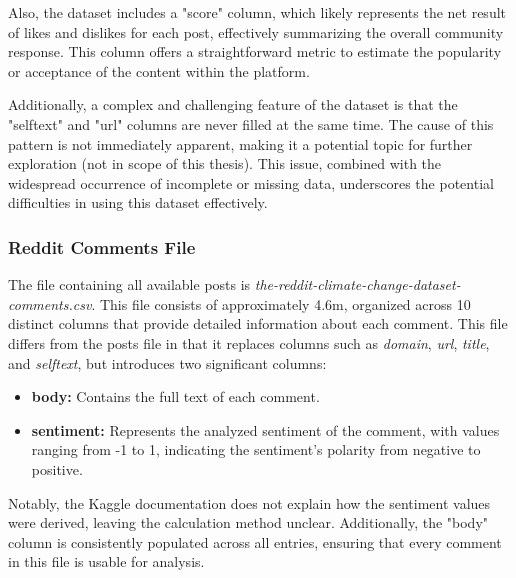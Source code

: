 Also, the dataset includes a "score" column, which likely represents the net result of likes and dislikes for each post, effectively summarizing the overall community response. This column offers a straightforward metric to estimate the popularity or acceptance of the content within the platform.

Additionally, a complex and challenging feature of the dataset is that the "selftext" and "url" columns are never filled at the same time. The cause of this pattern is not immediately apparent, making it a potential topic for further exploration (not in scope of this thesis). This issue, combined with the widespread occurrence of incomplete or missing data, underscores the potential difficulties in using this dataset effectively.

\subsubsection{Reddit Comments File}
The file containing all available posts is \emph{the-reddit-climate-change-dataset-comments.csv}. This file consists of approximately 4.6m, organized across 10 distinct columns that provide detailed information about each comment. This file differs from the posts file in that it replaces columns such as \emph{domain}, \emph{url}, \emph{title}, and \emph{selftext}, but introduces two significant columns:
\begin{itemize}
    \item \textbf{body:} Contains the full text of each comment.
    \item \textbf{sentiment:} Represents the analyzed sentiment of the comment, with values ranging from -1 to 1, indicating the sentiment's polarity from negative to positive.
\end{itemize}
Notably, the Kaggle documentation does not explain how the sentiment values were derived, leaving the calculation method unclear. Additionally, the "body" column is consistently populated across all entries, ensuring that every comment in this file is usable for analysis.

